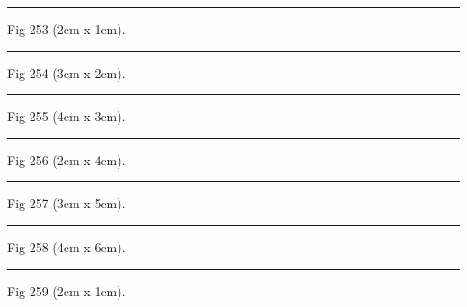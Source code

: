 \documentclass[a4paper,11pt]{article}
\begin{document}
\begin{swarmwrap}%
  \begin{minipage}[t]{2cm}
    \centering
    \rule{\linewidth}{1cm}
    {\footnotesize Fig 253 (2cm x 1cm).}
  \end{minipage}%
\end{swarmwrap}%
\swarmwrapnext
\lipsum[103]%

\begin{swarmwrap}%
  \begin{minipage}[t]{3cm}
    \centering
    \rule{\linewidth}{2cm}
    {\footnotesize Fig 254 (3cm x 2cm).}
  \end{minipage}%
\end{swarmwrap}%
\swarmwrapnext
\lipsum[104]%

\begin{swarmwrap}%
  \begin{minipage}[t]{4cm}
    \centering
    \rule{\linewidth}{3cm}
    {\footnotesize Fig 255 (4cm x 3cm).}
  \end{minipage}%
\end{swarmwrap}%
\swarmwrapnext
\lipsum[105]%

\begin{swarmwrap}%
  \begin{minipage}[t]{2cm}
    \centering
    \rule{\linewidth}{4cm}
    {\footnotesize Fig 256 (2cm x 4cm).}
  \end{minipage}%
\end{swarmwrap}%
\swarmwrapnext
\lipsum[106]%

\begin{swarmwrap}%
  \begin{minipage}[t]{3cm}
    \centering
    \rule{\linewidth}{5cm}
    {\footnotesize Fig 257 (3cm x 5cm).}
  \end{minipage}%
\end{swarmwrap}%
\swarmwrapnext
\lipsum[107]%

\begin{swarmwrap}%
  \begin{minipage}[t]{4cm}
    \centering
    \rule{\linewidth}{6cm}
    {\footnotesize Fig 258 (4cm x 6cm).}
  \end{minipage}%
\end{swarmwrap}%
\swarmwrapnext
\lipsum[108]%

\begin{swarmwrap}%
  \begin{minipage}[t]{2cm}
    \centering
    \rule{\linewidth}{1cm}
    {\footnotesize Fig 259 (2cm x 1cm).}
  \end{minipage}%
\end{swarmwrap}%
\swarmwrapnext
\lipsum[109]%
\end{document}
